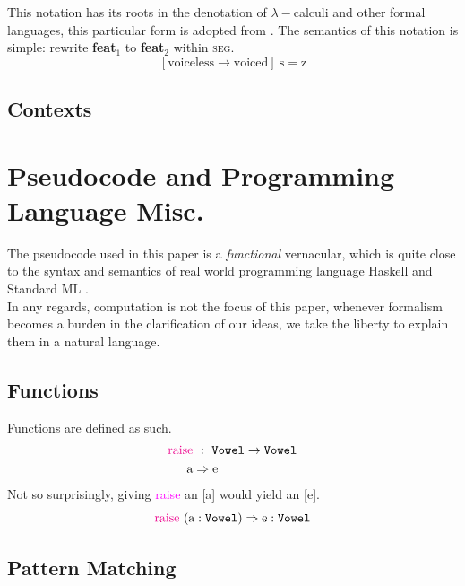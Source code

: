 \documentclass{report}[12pt]
\begin{document}
This notation has its roots in the denotation of $\lambda-$calculi and other formal languages, this particular form is adopted from \cite{tpl}. The semantics of this notation is simple: rewrite \textbf{feat}$_1$ to \textbf{feat}$_2$ within \textsc{seg}.
\[ [\text{voiceless} \rightarrow \text{voiced}]\ \text{s} = \text{z} \]

\subsection*{Contexts}

\section*{Pseudocode and Programming Language Misc.}

The pseudocode used in this paper is a \emph{functional} vernacular, which is quite close to the syntax and semantics of real world programming language Haskell \cite{haskell2010} and Standard ML \cite{def_sml}. \\
In any regards, computation is not the focus of this paper, whenever formalism becomes a burden in the clarification of our ideas, we take the liberty to explain them in a natural language.

\subsection*{Functions}

Functions are defined as such.
\begin{align*}
  \text{\textcolor{magenta}{raise}} &\ :\ \texttt{Vowel} \rightarrow \texttt{Vowel} \\
  \text{a} & \Rightarrow \text{e}
\end{align*}
Not so surprisingly, giving \textcolor{magenta}{raise} an [a] would yield an [e].
\[ \text{\textcolor{magenta}{raise}}\ (\text{a} : \texttt{Vowel}) \Rightarrow \text{e} : \texttt{Vowel} \]

\subsection*{Pattern Matching}
\end{document}

